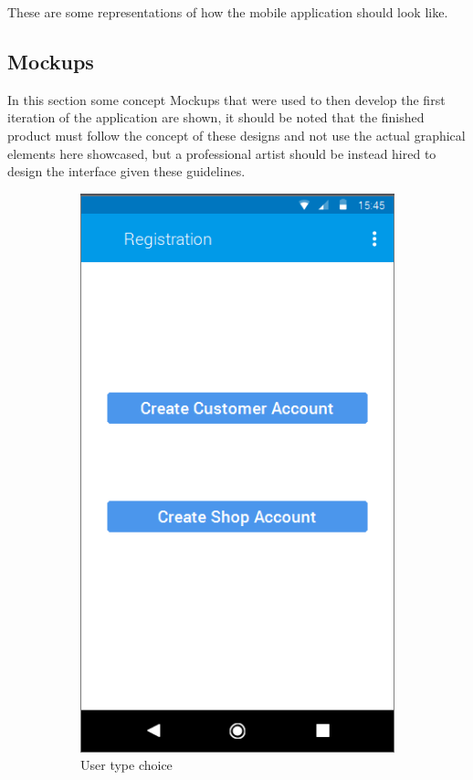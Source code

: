 \noindent These are some representations of how the mobile application should look like.\\ 
\subsection{Mockups}
In this section some concept Mockups that were used to then develop the first iteration of the application are shown, it should be noted that the finished product must follow the concept of these designs and not use the actual graphical elements here showcased, but a professional artist should be instead hired to design the interface given these guidelines.

\begin{figure}[h]
\centering
\begin{subfigure}{.5\textwidth}
  \centering
  \includegraphics[height=.4\textheight, keepaspectratio=true]{Img/Mockup_Registration}
  \caption{User type choice}
\end{subfigure}%
\begin{subfigure}{.5\textwidth}

\end{subfigure}
\end{figure}

